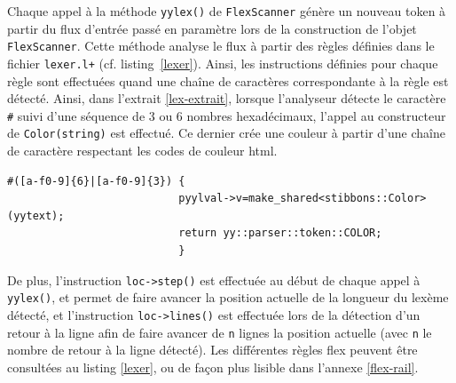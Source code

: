 Chaque appel à la méthode \verb|yylex()| de \verb|FlexScanner| génère un nouveau token à partir du flux d'entrée passé en paramètre lors de la construction de l'objet \verb|FlexScanner|. Cette méthode analyse le flux à partir des règles définies dans le fichier \verb|lexer.l+| (cf. listing~\ref{lexer}). Ainsi, les instructions définies pour chaque règle sont effectuées quand une chaîne de caractères correspondante à la règle est détecté. Ainsi, dans l'extrait \ref{lex-extrait}, lorsque l'analyseur détecte le caractère \verb|#| suivi d'une séquence de 3 ou 6 nombres hexadécimaux, l'appel au constructeur de \verb|Color(string)| est effectué. Ce dernier crée une couleur à partir d'une chaîne de caractère respectant les codes de couleur html.

\begin{lstlisting}[label=lex-extrait,caption=Exemple de séquence d'instruction lors de la détection d'une couleur]
#([a-f0-9]{6}|[a-f0-9]{3}) {
                           pyylval->v=make_shared<stibbons::Color>(yytext);
                           return yy::parser::token::COLOR;
                           }
\end{lstlisting}

De plus, l'instruction \verb|loc->step()| est effectuée au début de chaque appel à \verb|yylex()|, et permet de faire avancer la position actuelle de la longueur du lexème détecté, et l'instruction \verb|loc->lines()| est effectuée lors de la détection d'un retour à la ligne afin de faire avancer de \verb|n| lignes la position actuelle (avec \verb|n| le nombre de retour à la ligne détecté).
Les différentes règles flex peuvent être consultées au listing \ref{lexer}, ou de façon plus lisible dans l'annexe \ref{flex-rail}.
